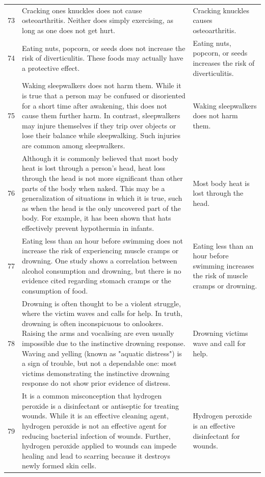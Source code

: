 \begin{tabular}{c|p{}|p{}}
73 & Cracking ones knuckles does not cause osteoarthritis. Neither does simply exercising, as long as one does not get hurt. & Cracking knuckles causes osteoarthritis. \\
74 & Eating nuts, popcorn, or seeds does not increase the risk of diverticulitis. These foods may actually have a protective effect. & Eating nuts, popcorn, or seeds increases the risk of diverticulitis. \\
75 & Waking sleepwalkers does not harm them. While it is true that a person may be confused or disoriented for a short time after awakening, this does not cause them further harm. In contrast, sleepwalkers may injure themselves if they trip over objects or lose their balance while sleepwalking. Such injuries are common among sleepwalkers. & Waking sleepwalkers does not harm them. \\
76 & Although it is commonly believed that most body heat is lost through a person's head, heat loss through the head is not more significant than other parts of the body when naked. This may be a generalization of situations in which it is true, such as when the head is the only uncovered part of the body. For example, it has been shown that hats effectively prevent hypothermia in infants. & Most body heat is lost through the head. \\
77 & Eating less than an hour before swimming does not increase the risk of experiencing muscle cramps or drowning. One study shows a correlation between alcohol consumption and drowning, but there is no evidence cited regarding stomach cramps or the consumption of food. & Eating less than an hour before swimming increases the risk of muscle cramps or drowning. \\
78 & Drowning is often thought to be a violent struggle, where the victim waves and calls for help. In truth, drowning is often inconspicuous to onlookers. Raising the arms and vocalising are even usually impossible due to the instinctive drowning response. Waving and yelling (known as "aquatic distress") is a sign of trouble, but not a dependable one: most victims demonstrating the instinctive drowning response do not show prior evidence of distress. & Drowning victims wave and call for help. \\
79 & It is a common misconception that hydrogen peroxide is a disinfectant or antiseptic for treating wounds. While it is an effective cleaning agent, hydrogen peroxide is not an effective agent for reducing bacterial infection of wounds. Further, hydrogen peroxide applied to wounds can impede healing and lead to scarring because it destroys newly formed skin cells. & Hydrogen peroxide is an effective disinfectant for wounds. \\

\end{tabular}
